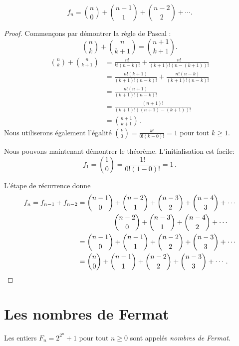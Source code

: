
\begin{theorem}
\[
f_n = \binom{n}{0} + \binom{n-1}{1} + \binom{n-2}{2} + \cdots.
\]
\end{theorem}

\begin{proof}
Commençons par démontrer la règle de Pascal :
\[
\binom{n}{k} + \binom{n}{k+1} = \binom{n+1}{k+1}.
\]
\begin{align*}
\binom{n}{k} + \binom{n}{k+1} &= \frac{n!}{k!(n-k)!} + \frac{n!}{(k+1)!(n-(k+1))!}\\
&=\frac{n!(k+1)}{(k+1)!(n-k)!}+\frac{n!(n-k)}{(k+1)!(n-k)!}\\
&=\frac{n!(n+1)}{(k+1)!(n-k)!}\\
&=\frac{(n+1)!}{(k+1)!((n+1)-(k+1))!}\\
&=\binom{n+1}{k+1}\,.
\end{align*}
Nous utiliserons également l'égalité $\displaystyle\binom{k}{0} = \frac{k!}{0!(k-0)!} = 1$ pour tout $k\geq 1$.

\medskip

Nous pouvons maintenant démontrer le théorème. L'initialisation est facile: 
\[
f_1 =  \binom{1}{0} = \frac{1!}{0!(1-0)!}=1\,.
\]



L'étape de récurrence donne
\begin{align*}
f_n=f_{n-1} + f_{n-2} &= \binom{n-1}{0} + \binom{n-2}{1} + \binom{n-3}{2} + \binom{n-4}{3} + \cdots\\
&\quad\quad\quad\quad\quad\, \binom{n-2}{0} + \binom{n-3}{1} + \binom{n-4}{2} + \cdots\\
&=\binom{n-1}{0} + \binom{n-1}{1} + \binom{n-2}{2} + \binom{n-3}{3} + \cdots\\
&=\binom{n}{0} + \binom{n-1}{1} + \binom{n-2}{2} + \binom{n-3}{3} + \cdots.\qedhere
\end{align*}

\end{proof}



\section{Les nombres de Fermat}\label{s.induction-fermat}

\begin{definition}
Les entiers $F_n=2^{2^{n}}+1$ pour tout $n\geq 0$ sont appelés \emph{nombres de Fermat}.
\end{definition}

